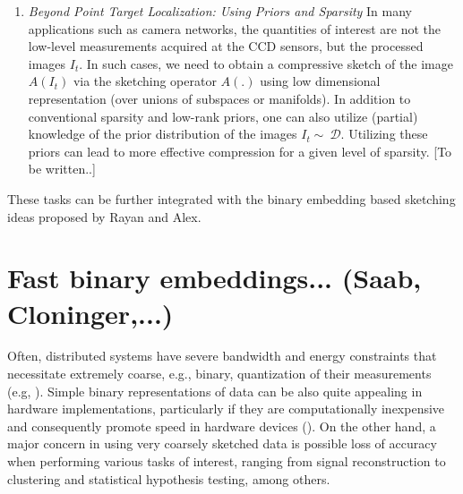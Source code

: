 \documentclass{article}
\newcommand{\comment}[3]{{\color{#1} {\bf #2 :} #3}}
\newcommand{\yoav}[1]{\comment{magenta}{Yoav}{#1}}
\newcommand{\rayan}[1]{\comment{red}{Rayan}{#1}}
\begin{document}
\begin{itemize}
\begin{enumerate}
\item {\em Beyond Point Target Localization: Using Priors and Sparsity} In many applications such as camera networks, the quantities of interest are not the low-level measurements acquired at the CCD sensors, but the processed images $I_t$. In such cases, we need to obtain a compressive sketch of the image $A (I_t)$ via the sketching operator $A (.)$ using low dimensional representation (over unions of subspaces or manifolds). In addition to conventional sparsity and low-rank priors, one can also utilize (partial) knowledge of the prior distribution of the images $I_t\sim~\mathcal{D}$. Utilizing these priors can lead to more effective compression for a given level of sparsity. {\color{red} [To be written..]}  
\end{enumerate}
{\color{red} These tasks can be further integrated with the binary embedding based sketching ideas proposed by Rayan and Alex.}
\end{itemize}

\section{Fast binary embeddings... (Saab, Cloninger,...)}

Often, distributed systems have severe bandwidth and energy constraints that necessitate extremely
coarse, e.g., binary, quantization of their measurements (e.g, \cite{fang2014sparse,boufounos20081}). Simple binary representations of data can be also quite appealing in hardware implementations, particularly if they are computationally inexpensive and consequently promote speed in hardware devices (\cite{jacques2013robust,le2005analog}). On the other hand, a major concern in using very coarsely sketched data is possible loss of accuracy when performing various tasks of interest, ranging from signal reconstruction to clustering and statistical hypothesis testing, among others.
\end{document}
